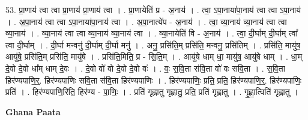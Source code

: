 \documentclass[17pt]{extarticle}
\begin{document}
53. प्रा॒णाय॑ त्वा त्वा प्रा॒णाय॑ प्रा॒णाय॑ त्वा । . प्रा॒णायेति॑ प्र - अ॒नाय॑ । . त्वा॒ ऽपा॒नाया॑पा॒नाय॑ त्वा त्वा ऽपा॒नाय॑ । . अ॒पा॒नाय॑ त्वा त्वा ऽपा॒नाया॑पा॒नाय॑ त्वा । . अ॒पा॒नात्ये॑प - अ॒नाय॑ । . त्वा॒ व्या॒नाय॑ व्या॒नाय॑ त्वा त्वा व्या॒नाय॑ । . व्या॒नाय॑ त्वा त्वा व्या॒नाय॑ व्या॒नाय॑ त्वा । . व्या॒नायेति॑ वि - अ॒नाय॑ । . त्वा॒ दी॒र्घाम् दी॒र्घाम् त्वा᳚ त्वा दी॒र्घाम् । . दी॒र्घा मन्वनु॑ दी॒र्घाम् दी॒र्घा मनु॑ । . अनु॒ प्रसि॑ति॒म् प्रसि॑ति॒ मन्वनु॒ प्रसि॑तिम् । . प्रसि॑ति॒ मायु॑ष॒ आयु॑षे॒ प्रसि॑ति॒म् प्रसि॑ति॒ मायु॑षे । . प्रसि॑ति॒मिति॒ प्र - सि॒ति॒म् । . आयु॑षे धाम् धा॒ मायु॑ष॒ आयु॑षे धाम् । . धा॒म् दे॒वो दे॒वो धा᳚म् धाम् दे॒वः । . दे॒वो वो॑ वो दे॒वो दे॒वो वः॑ । . वः॒ स॒वि॒ता स॑वि॒ता वो॑ वः सवि॒ता । . स॒वि॒ता हिर॑ण्यपाणि॒र्॒. हिर॑ण्यपाणिः सवि॒ता स॑वि॒ता हिर॑ण्यपाणिः । . हिर॑ण्यपाणिः॒ प्रति॒ प्रति॒ हिर॑ण्यपाणि॒र्॒. हिर॑ण्यपाणिः॒ प्रति॑ । . हिर॑ण्यपाणि॒रिति॒ हिर॑ण्य - पा॒णिः॒ । . प्रति॑ गृह्णातु गृह्णातु॒ प्रति॒ प्रति॑ गृह्णातु । . गृ॒ह्णा॒त्विति॑ गृह्णातु । \newline

\textbf{Ghana Paata } \newline
\end{document}
